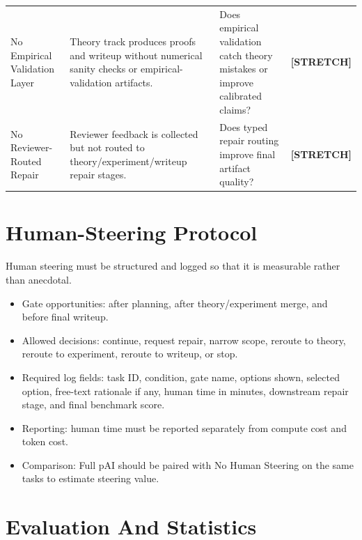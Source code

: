 \documentclass[11pt]{article}
\newcommand{\tagstretch}{\textbf{\textcolor{blue!65!black}{[STRETCH]}}}
\newcommand{\pai}{pAI}
\begin{document}
\begin{longtable}{>{\raggedright\arraybackslash}p{} >{\raggedright\arraybackslash}p{} >{\raggedright\arraybackslash}p{} >{\raggedright\arraybackslash}p{}}
No Empirical Validation Layer & Theory track produces proofs and writeup without numerical sanity checks or empirical-validation artifacts. & Does empirical validation catch theory mistakes or improve calibrated claims? & \tagstretch{} \\
No Reviewer-Routed Repair & Reviewer feedback is collected but not routed to theory/experiment/writeup repair stages. & Does typed repair routing improve final artifact quality? & \tagstretch{} \\
\bottomrule
\end{longtable}

\section*{Human-Steering Protocol}

Human steering must be structured and logged so that it is measurable rather than anecdotal.

\begin{itemize}
  \item Gate opportunities: after planning, after theory/experiment merge, and before final writeup.
  \item Allowed decisions: continue, request repair, narrow scope, reroute to theory, reroute to experiment, reroute to writeup, or stop.
  \item Required log fields: task ID, condition, gate name, options shown, selected option, free-text rationale if any, human time in minutes, downstream repair stage, and final benchmark score.
  \item Reporting: human time must be reported separately from compute cost and token cost.
  \item Comparison: Full \pai{} should be paired with No Human Steering on the same tasks to estimate steering value.
\end{itemize}

\section*{Evaluation And Statistics}
\end{document}
